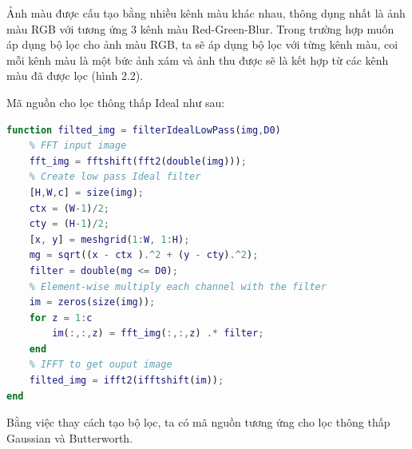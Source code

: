 Ảnh màu được cấu tạo bằng nhiều kênh màu khác nhau, thông dụng nhất là ảnh màu RGB với tương ứng 3 kênh màu Red-Green-Blur. Trong trường hợp muốn áp dụng bộ lọc cho ảnh màu RGB, ta sẽ áp dụng bộ lọc với từng kênh màu, coi mỗi kênh màu là một bức ảnh xám và ảnh thu được sẽ là kết hợp từ các kênh màu đã được lọc (hình 2.2).
\par Mã nguồn cho lọc thông thấp Ideal như sau:

\begin{lstlisting}[language=Matlab]
function filted_img = filterIdealLowPass(img,D0)
    % FFT input image
    fft_img = fftshift(fft2(double(img)));
    % Create low pass Ideal filter
    [H,W,c] = size(img);
    ctx = (W-1)/2;
    cty = (H-1)/2;
    [x, y] = meshgrid(1:W, 1:H);
    mg = sqrt((x - ctx ).^2 + (y - cty).^2);
    filter = double(mg <= D0);
    % Element-wise multiply each channel with the filter
    im = zeros(size(img));
    for z = 1:c
        im(:,:,z) = fft_img(:,:,z) .* filter;
    end 
    % IFFT to get ouput image
    filted_img = ifft2(ifftshift(im));
end
\end{lstlisting}
Bằng việc thay cách tạo bộ lọc, ta có mã nguồn tương ứng cho lọc thông thấp Gaussian và Butterworth.

